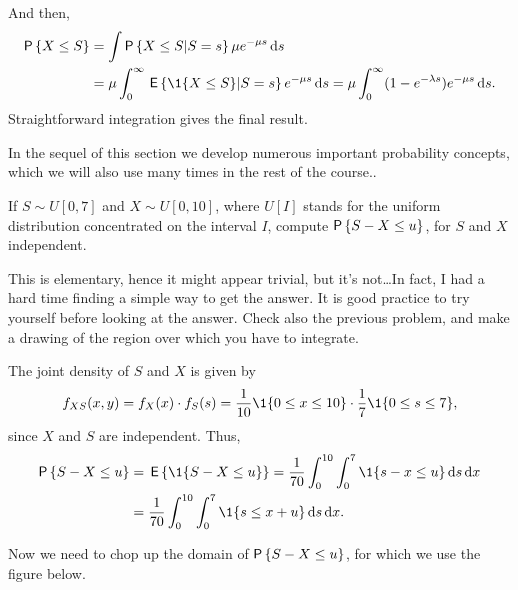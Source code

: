 \begin{exercise}
\begin{solution}
And then,  
\begin{equation*}
  \begin{split}
  \P{X\leq S} &= \int \P{X\leq S| S=s} \mu e^{-\mu s}\d s \\
&= \mu \int_0^\infty \E{\1{X \leq S}| S=s } e^{-\mu s} \d s= \mu \int_0^\infty (1 - e^{-\lambda s})e^{-\mu s} \d s.
  \end{split}
\end{equation*}
Straightforward integration gives the final result.
\end{solution}
\end{exercise}

In the sequel of this section we  develop numerous important probability concepts, which we will also use many times in the rest of the course..

\begin{exercise}
  If $S\sim U[0,7]$ and $X\sim U[0,10]$, where $U[I]$ stands for the
  uniform distribution concentrated on the interval $I$, compute
  $\P{S-X\leq u}$, for  $S$ and $X$ independent.
  \begin{hint}
  This is elementary, hence it might appear trivial, but it's not\ldots In fact, I had a hard time finding a simple way to get the answer.  It is good practice to try yourself before looking at the answer. Check also the previous problem, and make a drawing of the region over which you have to integrate.
  \end{hint}
  \begin{solution}
The joint density of $S$ and $X$ is given by
\begin{equation*}
  f_{XS}(x,y) = f_X(x) \cdot f_S(s) = \frac{1}{10} \1{0\leq x \leq 10}\cdot \frac 17 \1{0\leq s \leq 7},
\end{equation*}
since $X$ and $S$ are independent. 
Thus, 
\begin{equation*}
  \begin{split}
  \P{S-X\leq u} &= \E{\1{S-X\leq u}} = \frac{1}{70}\int_0^{10} \int_0^7 \1{s-x\leq u} \d s \d x \\
&= \frac{1}{70}\int_0^{10} \int_0^7 \1{s\leq x+u} \d s \d x.
  \end{split}
\end{equation*}

Now we need to chop up the domain of $\P{S-X\leq u}$, for which we use the figure below.


\end{solution}
\end{exercise}
